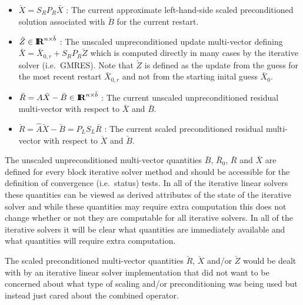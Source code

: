 \documentclass[pdf,ps2pdf,11pt]{SANDreport}
\begin{document}
\begin{itemize}
{}\item $\breve{X} = S_R P_R \bar{X}$ : The current approximate
left-hand-side scaled preconditioned solution associated with
$\breve{B}$ for the current restart.

{}\item $\breve{Z}\in\mbox{\textbf{I}}\hspace{-0.6ex}\mbox{\textbf{R}}^{n {}\times {}\bar{b}}$ : The unscaled
unpreconditioned update multi-vector defining $\bar{X} = \bar{X}_{0,r}
+ S_R P_R {}\breve{Z}$ which is computed directly in many cases by the
iterative solver (i.e.~GMRES).  Note that $\breve{Z}$ is defined as
the update from the guess for the most recent restart $\bar{X}_{0,r}$
and not from the starting inital guess $\bar{X}_0$.

{}\item $\bar{R} = A \bar{X} - \bar{B} {}\in\mbox{\textbf{I}}\hspace{-0.6ex}\mbox{\textbf{R}}^{n {}\times
{}\bar{b}}$ : The current unscaled unpreconditioned residual
multi-vector with respect to $\bar{X}$ and $\bar{B}$.

{}\item $\breve{R} = \hat{A} \breve{X} - \breve{B} = P_L S_L \bar{R}$
: The current scaled preconditioned residual multi-vector with respect
to $\breve{X}$ and $\breve{B}$.

\end{itemize}

The unscaled unpreconditioned multi-vector quantities $\bar{B}$,
$\bar{R}_0$, $\bar{R}$ and $\bar{X}$ are defined for every block
iterative solver method and should be accessible for the definition of
convergence (i.e.~status) tests.  In all of the iterative linear
solvers these quantities can be viewed as derived attributes of the
state of the iterative solver and while these quantities may require
extra computation this does not change whether or not they are
computable for all iterative solvers.  In all of the iterative solvers
it will be clear what quantities are immediately available and what
quantities will require extra computation.

The scaled preconditioned multi-vector quantities $\breve{R}$,
$\breve{X}$ and/or $\breve{Z}$ would be dealt with by an iterative
linear solver implementation that did not want to be concerned about
what type of scaling and/or preconditioning was being used but instead
just cared about the combined operator.
\end{document}
